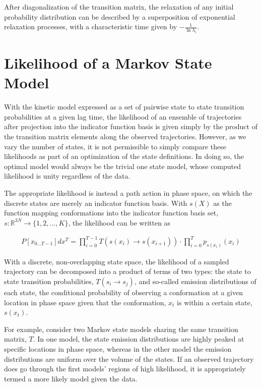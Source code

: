 \documentclass[twocolumn,floatfix,nofootinbib,aps]{revtex4-1}
\begin{document}
After diagonalization of the transition matrix, the relaxation of any initial probability distribution can be described by a superposition of exponential relaxation processes, with a characteristic time given by $-\frac{1}{\ln \lambda_i}$.

\section{Likelihood of a Markov State Model}
With the kinetic model expressed as a set of pairwise state to state transition probabilities at a given lag time, the likelihood of an ensemble of trajectories after projection into the indicator function basis is given simply by the product of the transition matrix elements along the observed trajectories. However, as we vary the number of states, it is not permissible to simply compare these likelihoods as part of an optimization of the state definitions. In doing so, the optimal model would always be the trivial one state model, whose computed likelihood is unity regardless of the data.

The appropriate likelihood is instead a path action in phase space, on which the discrete states are merely an indicator function basis. With $s(X)$ as the function mapping conformations into the indicator function basis set, $s : \mathbb{R}^{3N} \rightarrow \{1, 2, \ldots, K\}$, the likelihood can be written as

\begin{align}
P[x_{0...T-1}] dx^T = \prod_{i=0}^{T-1} T(s(x_i) \rightarrow s(x_{i+1})) \cdot \prod_{i=0}^{T} p_{s(x_i)}(x_{i})
\label{eq:like}
\end{align}

With a discrete, non-overlapping state space, the likelihood of a sampled trajectory can be decomposed into a product of terms of two types: the state to state transition probabilities, $T(s_i \rightarrow s_j)$, and so-called emission distributions of each state, the conditional probability of observing a conformation at a given location in phase space given that the conformation, $x_t$ is within a certain state, $s(x_t)$.

For example, consider two Markov state models sharing the same transition matrix, $T$. In one model, the state emission distributions are highly peaked at specific locations in phase space, whereas in the other model the emission distributions are uniform over the volume of the states. If an observed trajectory does go through the first models' regions of high likelihood, it is appropriately termed a more likely model given the data.
\end{document}
